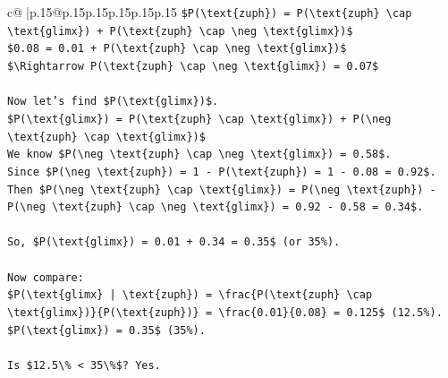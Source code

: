 \documentclass{article}
\begin{document}
{\begin{supertabular}{c@{$\;$}|p{.15\linewidth}@{}p{.15\linewidth}p{.15\linewidth}p{.15\linewidth}p{.15\linewidth}p{.15\linewidth}}
{{{\texttt{\$P(\textbackslash{}text\{zuph\}) = P(\textbackslash{}text\{zuph\} \textbackslash{}cap \textbackslash{}text\{glimx\}) + P(\textbackslash{}text\{zuph\} \textbackslash{}cap \textbackslash{}neg \textbackslash{}text\{glimx\})\$} \\
\texttt{\$0.08 = 0.01 + P(\textbackslash{}text\{zuph\} \textbackslash{}cap \textbackslash{}neg \textbackslash{}text\{glimx\})\$} \\
\texttt{\$\textbackslash{}Rightarrow P(\textbackslash{}text\{zuph\} \textbackslash{}cap \textbackslash{}neg \textbackslash{}text\{glimx\}) = 0.07\$} \\
\\ 
\texttt{Now let's find \$P(\textbackslash{}text\{glimx\})\$.} \\
\texttt{\$P(\textbackslash{}text\{glimx\}) = P(\textbackslash{}text\{zuph\} \textbackslash{}cap \textbackslash{}text\{glimx\}) + P(\textbackslash{}neg \textbackslash{}text\{zuph\} \textbackslash{}cap \textbackslash{}text\{glimx\})\$} \\
\texttt{We know \$P(\textbackslash{}neg \textbackslash{}text\{zuph\} \textbackslash{}cap \textbackslash{}neg \textbackslash{}text\{glimx\}) = 0.58\$.} \\
\texttt{Since \$P(\textbackslash{}neg \textbackslash{}text\{zuph\}) = 1 {-} P(\textbackslash{}text\{zuph\}) = 1 {-} 0.08 = 0.92\$.} \\
\texttt{Then \$P(\textbackslash{}neg \textbackslash{}text\{zuph\} \textbackslash{}cap \textbackslash{}text\{glimx\}) = P(\textbackslash{}neg \textbackslash{}text\{zuph\}) {-} P(\textbackslash{}neg \textbackslash{}text\{zuph\} \textbackslash{}cap \textbackslash{}neg \textbackslash{}text\{glimx\}) = 0.92 {-} 0.58 = 0.34\$.} \\
\\ 
\texttt{So, \$P(\textbackslash{}text\{glimx\}) = 0.01 + 0.34 = 0.35\$ (or 35\%).} \\
\\ 
\texttt{Now compare:} \\
\texttt{\$P(\textbackslash{}text\{glimx\} | \textbackslash{}text\{zuph\}) = \textbackslash{}frac\{P(\textbackslash{}text\{zuph\} \textbackslash{}cap \textbackslash{}text\{glimx\})\}\{P(\textbackslash{}text\{zuph\})\} = \textbackslash{}frac\{0.01\}\{0.08\} = 0.125\$ (12.5\%).} \\
\texttt{\$P(\textbackslash{}text\{glimx\}) = 0.35\$ (35\%).} \\
\\ 
\texttt{Is \$12.5\textbackslash{}\% < 35\textbackslash{}\%\$? Yes.} \\
}}}
\end{supertabular}}
\end{document}

